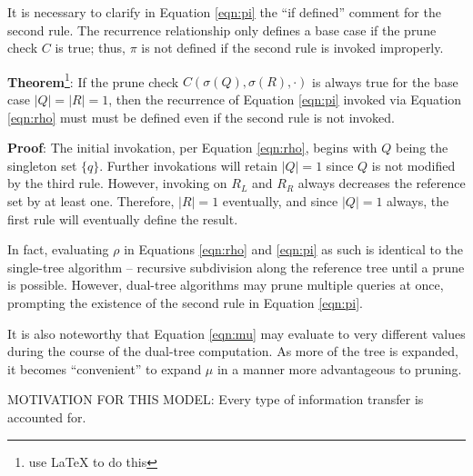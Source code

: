 \documentclass[times, 10pt,twocolumn]{article}
\newcommand{\allrho}{\rho}
\newcommand{\allsigma}{\sigma}
\begin{document}
It is necessary to clarify in Equation \ref{eqn:pi} the ``if defined'' comment for the second rule.
The recurrence relationship only defines a base case if the prune check $C$ is true; thus, $\pi$ is not defined if the second rule is invoked improperly.

{\bf Theorem}\footnote{use LaTeX to do this}: If the prune check $C(\allsigma(Q), \allsigma(R), \cdot)$ is always true for the base case $|Q| = |R| = 1$, then the recurrence of Equation \ref{eqn:pi} invoked via Equation \ref{eqn:rho} must must be defined even if the second rule is not invoked.

{\bf Proof}: The initial invokation, per Equation \ref{eqn:rho}, begins with $Q$ being the singleton set $\{q\}$.  Further invokations will retain $|Q| = 1$ since $Q$ is not modified by the third rule.  However, invoking on $R_L$ and $R_R$ always decreases the reference set by at least one.  Therefore, $|R| = 1$ eventually, and since $|Q| = 1$ always, the first rule will eventually define the result.

In fact, evaluating $\allrho$ in Equations \ref{eqn:rho} and \ref{eqn:pi} as such is identical to the single-tree algorithm -- recursive subdivision along the reference tree until a prune is possible.
However, dual-tree algorithms may prune multiple queries at once, prompting the existence of the second rule in Equation \ref{eqn:pi}.

It is also noteworthy that Equation \ref{eqn:mu} may evaluate to very different values during the course of the dual-tree computation.
As more of the tree is expanded, it becomes ``convenient'' to expand $\mu$ in a manner more advantageous to pruning.

MOTIVATION FOR THIS MODEL: Every type of information transfer is accounted for.


\nocite{ex1,ex2}


\end{document}
